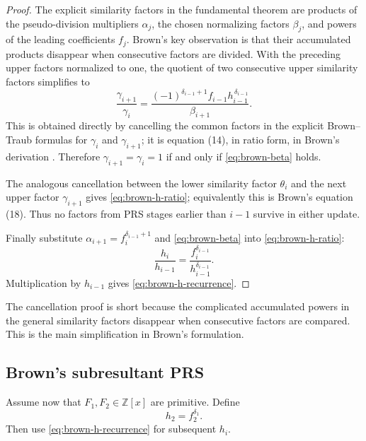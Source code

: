 \documentclass[11pt]{book}
\theoremstyle{definition}
\newcommand{\ZZ}{\mathbb Z}
\begin{document}
\begin{proof}
The explicit similarity factors in the fundamental theorem are products of
the pseudo-division multipliers $\alpha_j$, the chosen normalizing factors
$\beta_j$, and powers of the leading coefficients $f_j$.  Brown's key
observation is that their accumulated products disappear when consecutive
factors are divided.  With the preceding upper factors normalized to one,
the quotient of two consecutive upper similarity factors simplifies to
\begin{equation}\label{eq:brown-gamma-ratio}
 \frac{\gamma_{i+1}}{\gamma_i}
 =\frac{(-1)^{\delta_{i-1}+1}
         f_{i-1}h_{i-1}^{\,\delta_{i-1}}}
        {\beta_{i+1}}.
\end{equation}
This is obtained directly by cancelling the common factors in the explicit
Brown--Traub formulas for $\gamma_i$ and $\gamma_{i+1}$; it is equation
(14), in ratio form, in Brown's derivation \cite{Brown1978}.  Therefore
$\gamma_{i+1}=\gamma_i=1$ if and only if
\eqref{eq:brown-beta} holds.

The analogous cancellation between the lower similarity factor $\theta_i$
and the next upper factor $\gamma_{i+1}$ gives
\eqref{eq:brown-h-ratio}; equivalently this is Brown's equation (18).
Thus no factors from PRS stages earlier than $i-1$ survive in either update.

Finally substitute
$\alpha_{i+1}=f_i^{\delta_{i-1}+1}$ and
\eqref{eq:brown-beta} into \eqref{eq:brown-h-ratio}:
\[
 \frac{h_i}{h_{i-1}}
 =\frac{f_i^{\delta_{i-1}}}
        {h_{i-1}^{\delta_{i-1}}}.
\]
Multiplication by $h_{i-1}$ gives
\eqref{eq:brown-h-recurrence}.
\end{proof}

The cancellation proof is short because the complicated accumulated powers
in the general similarity factors disappear when consecutive factors are
compared.  This is the main simplification in Brown's formulation.

\subsection{Brown's subresultant PRS}

Assume now that $F_1,F_2\in\ZZ[x]$ are primitive.  Define
\begin{equation}\label{eq:brown-h-initial}
 h_2=f_2^{\delta_1}.
\end{equation}
Then use \eqref{eq:brown-h-recurrence} for subsequent $h_i$.
\end{document}

